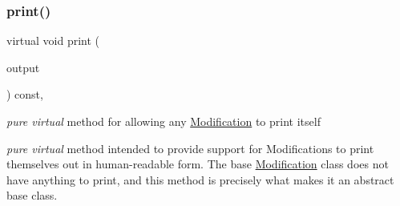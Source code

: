 \subsubsection{\texorpdfstring{print()}{print()}}
{\footnotesize\ttfamily virtual void print (\begin{DoxyParamCaption}\item[{std\+::ostream \&}]{output }\end{DoxyParamCaption}) const\hspace{0.3cm}{\ttfamily [protected]}, {}}



{\itshape pure virtual} method for allowing any \mbox{\hyperlink{class_s_m_spp__di__unipi__it_1_1_modification}{Modification}} to print itself 

{\itshape pure virtual} method intended to provide support for Modifications to print themselves out in human-\/readable form. The base \mbox{\hyperlink{class_s_m_spp__di__unipi__it_1_1_modification}{Modification}} class does not have anything to print, and this method is precisely what makes it an abstract base class. 

